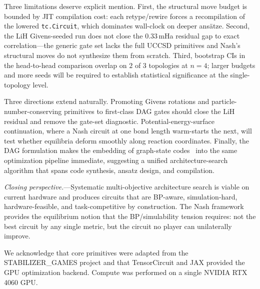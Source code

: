 \documentclass[prl,twocolumn,aps,superscriptaddress,showkeys,floatfix,nofootinbib]{revtex4-2}
\begin{document}
Three limitations deserve explicit mention. First, the structural move budget is bounded by JIT compilation cost: each retype/rewire forces a recompilation of the lowered \texttt{tc.Circuit}, which dominates wall-clock on deeper ans\"atze. Second, the LiH Givens-seeded run does not close the $0.33$\,mHa residual gap to exact correlation---the generic gate set lacks the full UCCSD primitives and Nash's structural moves do not synthesize them from scratch. Third, bootstrap CIs in the head-to-head comparison overlap on $2$ of $3$ topologies at $n=4$; larger budgets and more seeds will be required to establish statistical significance at the single-topology level.

Three directions extend naturally. Promoting Givens rotations and particle-number-conserving primitives to first-class DAG gates should close the LiH residual and remove the gate-set diagnostic. Potential-energy-surface continuation, where a Nash circuit at one bond length warm-starts the next, will test whether equilibria deform smoothly along reaction coordinates. Finally, the DAG formulation makes the embedding of graph-state codes~\cite{hein2004graphstates} into the same optimization pipeline immediate, suggesting a unified architecture-search algorithm that spans code synthesis, ansatz design, and compilation.

\textit{Closing perspective.}---Systematic multi-objective architecture search is viable on current hardware and produces circuits that are BP-aware, simulation-hard, hardware-feasible, and task-competitive by construction. The Nash framework provides the equilibrium notion that the BP/simulability tension requires: not the best circuit by any single metric, but the circuit no player can unilaterally improve.

\begin{acknowledgments}
We acknowledge that core primitives were adapted from the STABILIZER\_GAMES project and that TensorCircuit and JAX provided the GPU optimization backend. Compute was performed on a single NVIDIA RTX\,4060 GPU.
\end{acknowledgments}
\end{document}
